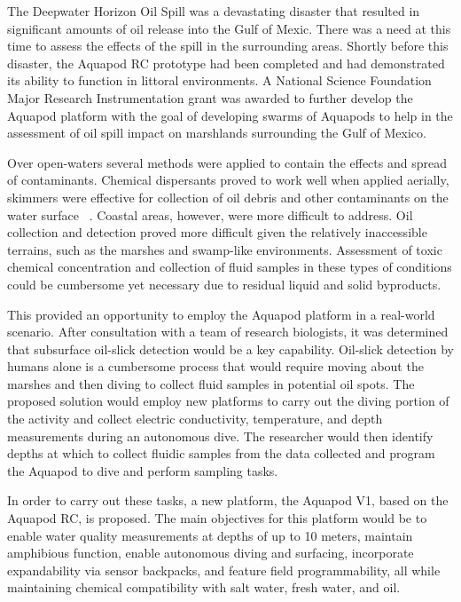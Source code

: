 	The Deepwater Horizon Oil Spill \cite{Silliman2012} was a devastating disaster that resulted in significant amounts of oil release into the Gulf of Mexic. There was a need at this time to assess the effects of the spill in the surrounding areas. Shortly before this disaster, the Aquapod RC \cite{Carlson2011} prototype had been completed and had demonstrated its ability to function in littoral environments. A National Science Foundation Major Research Instrumentation grant was awarded to further develop the Aquapod platform with the goal of developing swarms of Aquapods to help in the assessment of oil spill impact on marshlands surrounding the Gulf of Mexico.  


	Over open-waters several methods were applied to contain the effects and spread of contaminants. Chemical dispersants proved to work well when applied aerially, skimmers were effective for collection of oil debris and other contaminants on the water surface ~\cite{Al-Majed2012}. Coastal areas, however, were more difficult to address. Oil collection and detection proved more difficult given the relatively inaccessible terrains, such as the marshes and swamp-like environments. Assessment of toxic chemical concentration and collection of fluid samples in these types of conditions could be cumbersome yet necessary due to residual liquid and solid byproducts.

	This provided an opportunity to employ the Aquapod platform in a real-world scenario. After consultation with a team of research biologists, it was determined that subsurface oil-slick detection would be a key capability. Oil-slick detection by humans alone is a cumbersome process that would require moving about the marshes and then diving to collect fluid samples in potential oil spots. The proposed solution would employ new platforms to carry out the diving portion of the activity and collect electric conductivity, temperature, and depth measurements during an autonomous dive. The researcher would then identify depths at which to collect fluidic samples from the data collected and program the Aquapod to dive and perform sampling tasks. 

	In order to carry out these tasks, a new platform, the Aquapod V1, based on the Aquapod RC, is proposed. The main objectives for this platform would be to enable water quality measurements at depths of up to 10 meters, maintain amphibious function, enable autonomous diving and surfacing, incorporate expandability via sensor backpacks, and feature field programmability, all while maintaining chemical compatibility with salt water, fresh water, and oil. 

